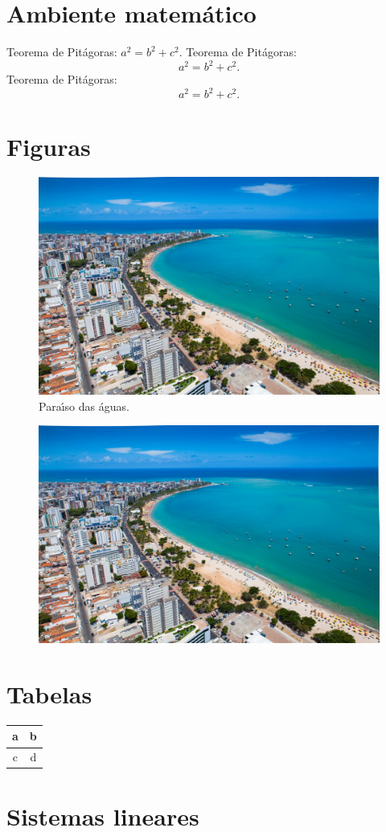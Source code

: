 \documentclass[12pt,a4paper]{article}
\begin{document}
\section{Ambiente matem\'atico}
Teorema de Pit\'agoras: $a^2=b^2+c^2$.
Teorema de Pit\'agoras: \[a^2=b^2+c^2.\]
Teorema de Pit\'agoras:
\begin{equation}
    a^2=b^2+c^2.
\end{equation}

\section{Figuras}
\begin{figure}[h]
    \includegraphics[scale=0.1]{maceio.jpg}
    \caption{Para\'{\i}so das \'aguas.}
\end{figure}
\begin{figure}[h]
    \centering
    \includegraphics[scale=0.1]{maceio.jpg}
\end{figure}

\section{Tabelas}
\begin{tabular}{|c|c|}
    \hline
    a & b \\
    \hline
    c & d \\
    \hline
\end{tabular}

\section{Sistemas lineares}
\end{document}
